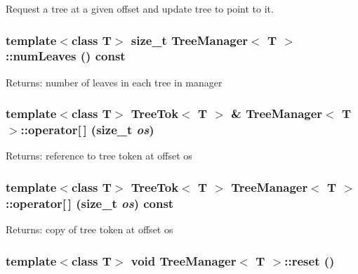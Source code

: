 Request a tree at a given offset and update tree to point to it. 

\subsubsection{\setlength{\rightskip}{0pt plus 5cm}template$<$class T$>$ size\_\-t {\bf Tree\-Manager}$<$ T $>$::num\-Leaves () const\hspace{0.3cm}{\tt  [inline]}}\label{classTreeManager_a5}


\begin{Desc}
\item[Returns:]number of leaves in each tree in manager \end{Desc}
\subsubsection{\setlength{\rightskip}{0pt plus 5cm}template$<$class T$>$ {\bf Tree\-Tok}$<$ T $>$ \& {\bf Tree\-Manager}$<$ T $>$::operator[$\,$] (size\_\-t {\em os})\hspace{0.3cm}{\tt  [inline]}}\label{classTreeManager_a3}


\begin{Desc}
\item[Returns:]reference to tree token at offset os \end{Desc}
\subsubsection{\setlength{\rightskip}{0pt plus 5cm}template$<$class T$>$ {\bf Tree\-Tok}$<$ T $>$ {\bf Tree\-Manager}$<$ T $>$::operator[$\,$] (size\_\-t {\em os}) const\hspace{0.3cm}{\tt  [inline]}}\label{classTreeManager_a2}


\begin{Desc}
\item[Returns:]copy of tree token at offset os \end{Desc}
\subsubsection{\setlength{\rightskip}{0pt plus 5cm}template$<$class T$>$ void {\bf Tree\-Manager}$<$ T $>$::reset ()}\label{classTreeManager_a7}


